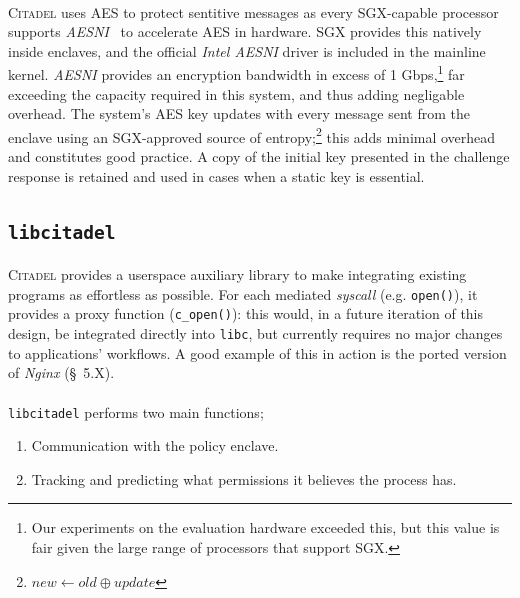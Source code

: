 \paragraph{} \textsc{Citadel} uses AES to protect sentitive messages as every SGX-capable processor supports \textit{AESNI}~\cite{aesni} to accelerate AES in hardware. SGX provides this natively inside enclaves, and the official \textit{Intel AESNI} driver is included in the mainline kernel. \textit{AESNI} provides an encryption bandwidth in excess of 1 Gbps,\footnote{Our experiments on the evaluation hardware exceeded this, but this value is fair given the large range of processors that support SGX.} far exceeding the capacity required in this system, and thus adding negligable overhead. The system's AES key updates with every message sent from the enclave using an SGX-approved source of entropy;\footnote{$new \leftarrow old \oplus update$} this adds minimal overhead and constitutes good practice. A copy of the initial key presented in the challenge response is retained and used in cases when a static key is essential.

\subsection{\texttt{libcitadel}}
\label{sec:libcitadel}
\paragraph{} \textsc{Citadel} provides a userspace auxiliary library to make integrating existing programs as effortless as possible. For each mediated \textit{syscall} (e.g. \texttt{open()}), it provides a proxy function (\texttt{c\_open()}): this would, in a future iteration of this design, be integrated directly into \texttt{libc}, but currently requires no major changes to applications' workflows. A good example of this in action is the ported version of \textit{Nginx} (§~5.X).

\paragraph{} \texttt{libcitadel} performs two main functions;
\begin{enumerate}
    \item Communication with the policy enclave.
    \item Tracking and predicting what permissions it believes the process has.
\end{enumerate}

